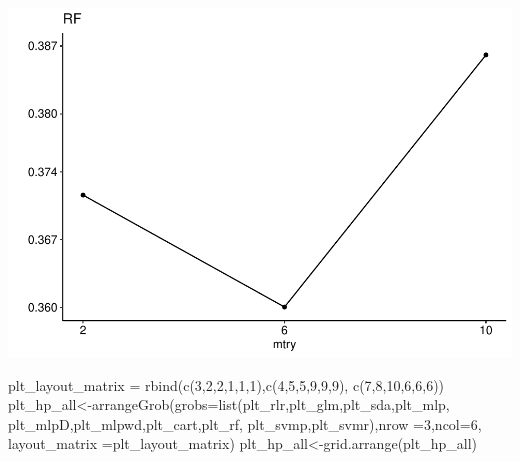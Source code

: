 \documentclass[
]{article}
\newenvironment{Shaded}{\begin{snugshade}}{\end{snugshade}}
\newcommand{\AttributeTok}[1]{\textcolor[rgb]{0.77,0.63,0.00}{#1}}
\newcommand{\DecValTok}[1]{\textcolor[rgb]{0.00,0.00,0.81}{#1}}
\newcommand{\FunctionTok}[1]{\textcolor[rgb]{0.00,0.00,0.00}{#1}}
\newcommand{\NormalTok}[1]{#1}
\newcommand{\OtherTok}[1]{\textcolor[rgb]{0.56,0.35,0.01}{#1}}
\begin{document}
\includegraphics{sl-inf-cairs-2301_files/figure-latex/optResults-10.pdf}

\begin{Shaded}
\begin{Highlighting}[]
\NormalTok{plt\_layout\_matrix }\OtherTok{=} \FunctionTok{rbind}\NormalTok{(}\FunctionTok{c}\NormalTok{(}\DecValTok{3}\NormalTok{,}\DecValTok{2}\NormalTok{,}\DecValTok{2}\NormalTok{,}\DecValTok{1}\NormalTok{,}\DecValTok{1}\NormalTok{,}\DecValTok{1}\NormalTok{),}\FunctionTok{c}\NormalTok{(}\DecValTok{4}\NormalTok{,}\DecValTok{5}\NormalTok{,}\DecValTok{5}\NormalTok{,}\DecValTok{9}\NormalTok{,}\DecValTok{9}\NormalTok{,}\DecValTok{9}\NormalTok{),}
                          \FunctionTok{c}\NormalTok{(}\DecValTok{7}\NormalTok{,}\DecValTok{8}\NormalTok{,}\DecValTok{10}\NormalTok{,}\DecValTok{6}\NormalTok{,}\DecValTok{6}\NormalTok{,}\DecValTok{6}\NormalTok{))}
\NormalTok{plt\_hp\_all}\OtherTok{\textless{}{-}}\FunctionTok{arrangeGrob}\NormalTok{(}\AttributeTok{grobs=}\FunctionTok{list}\NormalTok{(plt\_rlr,plt\_glm,plt\_sda,plt\_mlp,}
\NormalTok{                        plt\_mlpD,plt\_mlpwd,plt\_cart,plt\_rf,}
\NormalTok{                        plt\_svmp,plt\_svmr),}\AttributeTok{nrow =}\DecValTok{3}\NormalTok{,}\AttributeTok{ncol=}\DecValTok{6}\NormalTok{,}
                        \AttributeTok{layout\_matrix =}\NormalTok{plt\_layout\_matrix)}
\NormalTok{plt\_hp\_all}\OtherTok{\textless{}{-}}\FunctionTok{grid.arrange}\NormalTok{(plt\_hp\_all)}
\end{Highlighting}
\end{Shaded}
\end{document}
